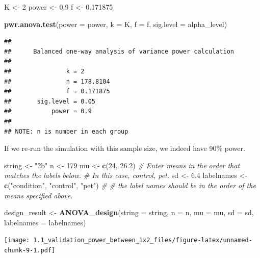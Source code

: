 \documentclass[]{article}
\newenvironment{Shaded}{\begin{snugshade}}{\end{snugshade}}
\newcommand{\KeywordTok}[1]{\textcolor[rgb]{0.13,0.29,0.53}{\textbf{#1}}}
\newcommand{\DataTypeTok}[1]{\textcolor[rgb]{0.13,0.29,0.53}{#1}}
\newcommand{\DecValTok}[1]{\textcolor[rgb]{0.00,0.00,0.81}{#1}}
\newcommand{\FloatTok}[1]{\textcolor[rgb]{0.00,0.00,0.81}{#1}}
\newcommand{\StringTok}[1]{\textcolor[rgb]{0.31,0.60,0.02}{#1}}
\newcommand{\CommentTok}[1]{\textcolor[rgb]{0.56,0.35,0.01}{\textit{#1}}}
\newcommand{\NormalTok}[1]{#1}
\begin{document}
\begin{Shaded}
\begin{Highlighting}[]
\NormalTok{K <-}\StringTok{ }\DecValTok{2}
\NormalTok{power <-}\StringTok{ }\FloatTok{0.9}
\NormalTok{f <-}\StringTok{ }\FloatTok{0.171875}

\KeywordTok{pwr.anova.test}\NormalTok{(}\DataTypeTok{power =}\NormalTok{ power,}
               \DataTypeTok{k =}\NormalTok{ K,}
               \DataTypeTok{f =}\NormalTok{ f,}
               \DataTypeTok{sig.level =}\NormalTok{ alpha_level)}
\end{Highlighting}
\end{Shaded}

\begin{verbatim}
## 
##      Balanced one-way analysis of variance power calculation 
## 
##               k = 2
##               n = 178.8104
##               f = 0.171875
##       sig.level = 0.05
##           power = 0.9
## 
## NOTE: n is number in each group
\end{verbatim}

If we re-run the simulation with this sample size, we indeed have 90\%
power.

\begin{Shaded}
\begin{Highlighting}[]
\NormalTok{string <-}\StringTok{ "2b"}
\NormalTok{n <-}\StringTok{ }\DecValTok{179}
\NormalTok{mu <-}\StringTok{ }\KeywordTok{c}\NormalTok{(}\DecValTok{24}\NormalTok{, }\FloatTok{26.2}\NormalTok{)}
\CommentTok{# Enter means in the order that matches the labels below.}
\CommentTok{# In this case, control, pet. }
\NormalTok{sd <-}\StringTok{ }\FloatTok{6.4}
\NormalTok{labelnames <-}\StringTok{ }\KeywordTok{c}\NormalTok{(}\StringTok{"condition"}\NormalTok{, }\StringTok{"control"}\NormalTok{, }\StringTok{"pet"}\NormalTok{) }\CommentTok{#}
\CommentTok{# the label names should be in the order of the means specified above.}

\NormalTok{design_result <-}\StringTok{ }\KeywordTok{ANOVA_design}\NormalTok{(}\DataTypeTok{string =}\NormalTok{ string,}
                   \DataTypeTok{n =}\NormalTok{ n, }
                   \DataTypeTok{mu =}\NormalTok{ mu, }
                   \DataTypeTok{sd =}\NormalTok{ sd, }
                   \DataTypeTok{labelnames =}\NormalTok{ labelnames)}
\end{Highlighting}
\end{Shaded}

\texttt{[image: 1.1\_validation\_power\_between\_1x2\_files/figure-latex/unnamed-chunk-9-1.pdf]}
\end{document}
